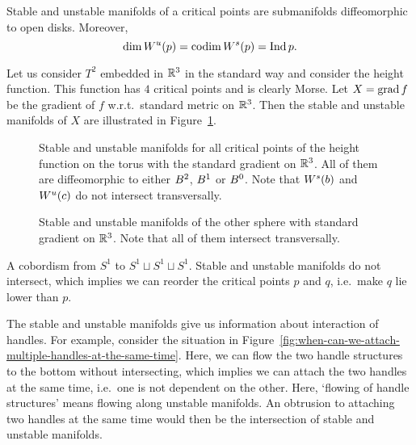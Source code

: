 \begin{prop}
    Stable and unstable manifolds of a critical points are submanifolds diffeomorphic to open disks. Moreover,
    \[
        \dim W^u(p) = \operatorname{codim} W^s(p) = \operatorname{Ind} p
    .\] 
\end{prop}





\begin{eg}
    Let us consider $T^{2}$ embedded in $\mathbb{R}^3$ in the standard way and consider the height function. 
    This function has $4$ critical points and is clearly Morse.
    Let $X = \operatorname{grad} f$ be the gradient of $f$ w.r.t.\ standard metric on $\mathbb{R}^{3}$.
    Then the stable and unstable manifolds of $X$ are illustrated in Figure~\ref{fig:torus-height-function-stable-and-unstable-manifolds}.
    \label{eg:torus-stable-unstable-manifolds-standard-gradient}
\end{eg}
    \begin{figure}[H]
        \centering
        \caption{
        Stable and unstable manifolds for all critical points of the height function on the torus with the standard gradient on $\mathbb{R}^3$.
    All of them are diffeomorphic to either $B^{2}$, $B^{1}$ or  $B^{0}$.
    Note that $W^s(b)$ and  $W^u(c)$ do not intersect transversally.
}
        \label{fig:torus-height-function-stable-and-unstable-manifolds}
    \end{figure}

    \begin{figure}[H]
        \centering
        \caption{
            Stable and unstable manifolds of the other sphere with standard gradient on $\mathbb{R}^3$.  Note that all of them intersect transversally.
        }
        \label{fig:other-sphere-definition-of-mathcal-m}
    \end{figure}


    \begin{marginfigure}
        \centering
        \caption{
            A cobordism from $S^{1}$ to $S^{1} \sqcup S^1 \sqcup S^1$.
            Stable and unstable manifolds do not intersect, which implies we can reorder the critical points $p$ and $q$, i.e.\ make $q$ lie lower than  $p$.
        }
        \label{fig:when-can-we-attach-multiple-handles-at-the-same-time}
    \end{marginfigure}
    The stable and unstable manifolds give us information about interaction of handles.
    For example, consider the situation in Figure~\ref{fig:when-can-we-attach-multiple-handles-at-the-same-time}.
    Here, we can flow the two handle structures to the bottom without intersecting, which implies we can attach the two handles at the same time, i.e.\ one is not dependent on the other.
    Here, `flowing of handle structures' means flowing along unstable manifolds.
    An obtrusion to attaching two handles at the same time would then be the intersection of stable and unstable manifolds.

